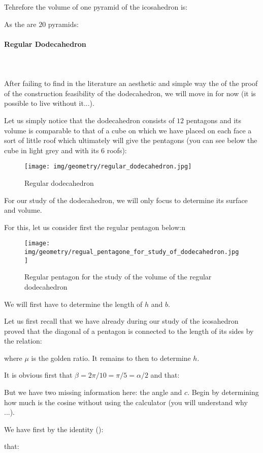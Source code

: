 {	Tehrefore the volume of one pyramid of the icosahedron is:
	
	As the are $20$ pyramids:
	
	
	\paragraph{Regular Dodecahedron}\mbox{}\\\\
	After failing to find in the literature an aesthetic and simple way the of the proof of the construction feasibility of the dodecahedron, we will move in for now (it is possible to live without it...).
	
	Let us simply notice that the dodecahedron consists of $12$ pentagons and its volume is comparable to that of a cube on which we have placed on each face a sort of little roof which ultimately will give the pentagons (you can see below the cube in light grey and with its $6$ roofs):
	\begin{figure}[H]
		\centering
		\texttt{[image: img/geometry/regular\_dodecahedron.jpg]}
		\caption{Regular dodecahedron}
	\end{figure}
	For our study of the dodecahedron, we will only focus to determine its surface and volume.
	
	For this, let us consider first the regular pentagon below:n
	\begin{figure}[H]
		\centering
		\texttt{[image: img/geometry/regual\_pentagone\_for\_study\_of\_dodecahedron.jpg]}
		\caption{Regular pentagon for the study of the volume of the regular dodecahedron}
	\end{figure}
	We will first have to determine the length of $h$ and $b$.

	Let us first recall that we have already during our study of the icosahedron proved that the diagonal of a pentagon is connected to the length of its sides by the relation:
	
	where $\mu$ is the golden ratio. It remains to  then to determine $h$.

	It is obvious first that $\beta=2\pi/10=\pi/5=\alpha/2$ and that:
	
	But we have two missing information here: the angle and $c$. Begin by determining how much is the cosine without using the calculator (you will understand why ...).

	We have first by the identity ():
	
	that:
	
}
